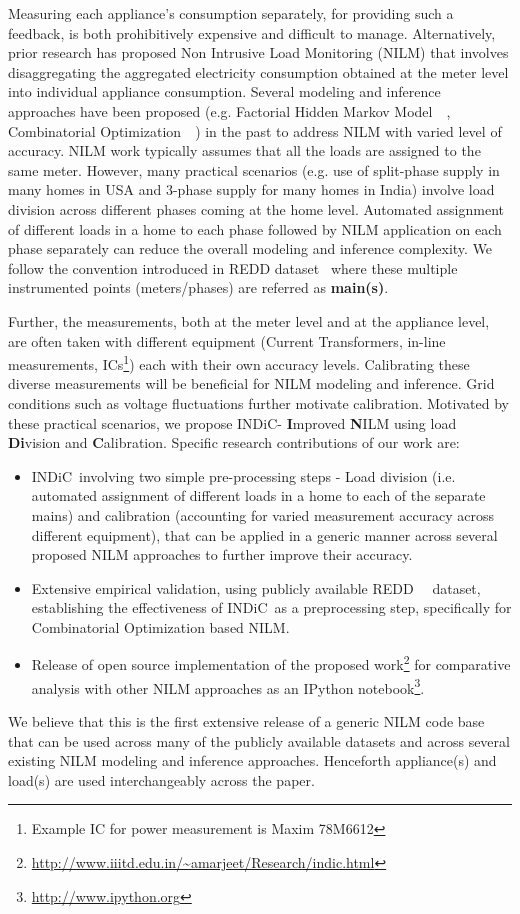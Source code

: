 \documentclass[conference]{IEEEtran}
\newcommand{\indic}{INDiC~}
\newcommand{\indicns}{INDiC}
\begin{document}
\noindent Measuring each appliance's consumption separately, for providing such a feedback, is both prohibitively expensive and difficult to manage. Alternatively, prior research has proposed Non Intrusive Load Monitoring (NILM) that involves disaggregating the aggregated electricity consumption obtained at the meter level into individual appliance consumption. Several modeling and inference approaches have been proposed (e.g. Factorial Hidden Markov Model~~\cite{Ghahramani_97a}, Combinatorial Optimization~~\cite{hart}) in the past to address NILM with varied level of accuracy. NILM work typically assumes that all the loads are assigned to the same meter. However, many practical scenarios (e.g. use of split-phase supply in many homes in USA and 3-phase supply for many homes in India) involve load division across different phases coming at the home level. Automated assignment of different loads in a home to each phase followed by NILM application on each phase separately can reduce the overall modeling and inference complexity. We follow the convention introduced in REDD dataset~\cite{redd} where these multiple instrumented points (meters/phases) are referred as \textbf{main(s)}.

\noindent Further, the measurements, both at the meter level and at the appliance level, are often taken with different equipment (Current Transformers, in-line measurements, ICs\footnote{Example IC for power measurement is Maxim 78M6612}) each with their own accuracy levels. Calibrating these diverse measurements will be beneficial for NILM modeling and inference. Grid conditions such as voltage fluctuations further motivate calibration. Motivated by these practical scenarios, we propose \indicns - \textbf{I}mproved \textbf{N}ILM using load \textbf{Di}vision and \textbf{C}alibration. Specific research contributions of our work are:
\begin{itemize}
\item \indic involving two simple pre-processing steps - Load division (i.e. automated assignment of different loads in a home to each of the separate mains) and calibration (accounting for varied measurement accuracy across different equipment), that can be applied in a generic manner across several proposed NILM approaches to further improve their accuracy. 
\item Extensive empirical validation, using publicly available REDD~~\cite{redd} dataset, establishing the effectiveness of \indic as a preprocessing step, specifically for Combinatorial Optimization based NILM. 
\item Release of open source implementation of the proposed work\footnote{\url{http://www.iiitd.edu.in/~amarjeet/Research/indic.html}} for comparative analysis with other NILM approaches as an IPython notebook\footnote{\url{http://www.ipython.org}}. 
\end{itemize}
\noindent We believe that this is the first extensive release of a generic NILM code base that can be used across many of the publicly available datasets and across several existing NILM modeling and inference approaches. Henceforth appliance(s) and load(s) are used interchangeably across the paper.
\end{document}
